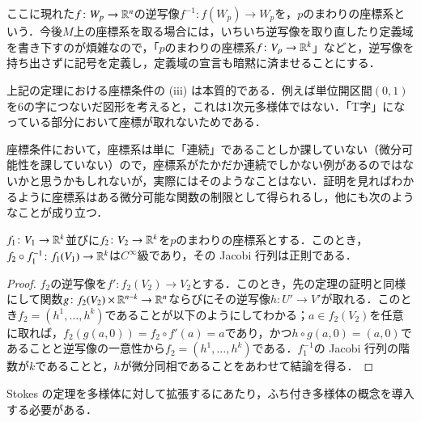 ここに現れた$f \colon W_p \to \mathbb{R}^n$の逆写像$f^{-1} \colon f(W_p) \to W_p$を，$p$のまわりの座標系という．今後$M$上の座標系を取る場合には，いちいち逆写像を取り直したり定義域を書き下すのが煩雑なので，「$p$のまわりの座標系$f \colon V_p \to \mathbb{R}^k$」などと，逆写像を持ち出さずに記号を定義し，定義域の宣言も暗黙に済ませることにする．

\begin{exm}
上記の定理における座標条件の (iii) は本質的である．例えば単位開区間$(0,1)$を6の字につないだ図形を考えると，これは1次元多様体ではない．「T字」になっている部分において座標が取れないためである．
\end{exm}

座標条件において，座標系は単に「連続」であることしか課していない（微分可能性を課していない）ので，座標系がたかだか連続でしかない例があるのではないかと思うかもしれないが，実際にはそのようなことはない．証明を見ればわかるように座標系はある微分可能な関数の制限として得られるし，他にも次のようなことが成り立つ．

\begin{prop}
$f_1 \colon V_1 \to \mathbb{R}^k$並びに$f_2 \colon V_2 \to \mathbb{R}^k$を$p$のまわりの座標系とする．このとき，$f_2 \circ f_1^{-1} \colon f_1(V_1) \to \mathbb{R}^k$は$C^\infty$級であり，その Jacobi 行列は正則である．
\end{prop}

\begin{proof}
$f_2$の逆写像を$f' \colon f_2(V_2) \to V_2$とする．このとき，先の定理の証明と同様にして関数$g \colon f_2(V_2) \times \mathbb{R}^{n-k} \to \mathbb{R}^n$ならびにその逆写像$h \colon U' \to V'$が取れる．このとき$f_2 = (h^1, \dots, h^k)$であることが以下のようにしてわかる；$a \in f_2(V_2)$を任意に取れば，$f_2 (g(a,0)) = f_2 \circ f'(a) = a$であり，かつ$h \circ g(a,0) = (a,0)$であることと逆写像の一意性から$f_2 = (h^1, \dots, h^k)$である．$f_1^{-1}$の Jacobi 行列の階数が$k$であることと，$h$が微分同相であることをあわせて結論を得る．
\end{proof}

Stokes の定理を多様体に対して拡張するにあたり，ふち付き多様体の概念を導入する必要がある．

